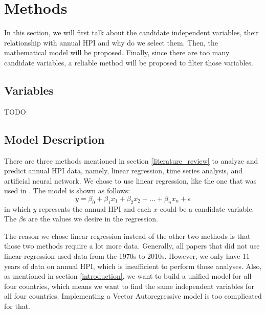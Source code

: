 \documentclass[11pt]{article}
\begin{document}
\section{Methods}\label{methods}
In this section, we will first talk about the candidate independent variables, their relationship with annual HPI and why do we select them. Then, the mathematical model will be proposed. Finally, since there are too many candidate variables, a reliable method will be proposed to filter those variables.

\subsection{Variables}\label{variables}
TODO

\subsection{Model Description}\label{model_description}
There are three methods mentioned in section \ref{literature_review} to analyze and predict annual HPI data, namely, linear regression, time series analysis, and artificial neural network. We chose to use linear regression, like the one that was used in \citet{GASPARENIENE2016122}. The model is shown as follows:
$$y = \beta_0 + \beta_1x_1 + \beta_2x_2 + ... + \beta_nx_n + \epsilon$$
in which $y$ represents the annual HPI and each $x$ could be a candidate variable. The $\beta$s are the values we desire in the regression.

The reason we chose linear regression instead of the other two methods is that those two methods require a lot more data. Generally, all papers that did not use linear regression used data from the 1970s to 2010s. However, we only have 11 years of data on annual HPI, which is insufficient to perform those analyses. Also, as mentioned in section \ref{introduction}, we want to build a unified model for all four countries, which means we want to find the same independent variables for all four countries. Implementing a Vector Autoregressive model is too complicated for that.
\end{document}

